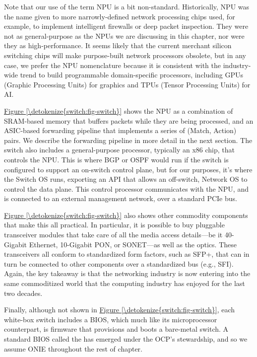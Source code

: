 \documentclass[letterpaper,11pt,english]{sphinxmanual}
\begin{document}
Note that our use of the term NPU is a bit non-standard. Historically,
NPU was the name given to more narrowly-defined network processing
chips used, for example, to implement intelligent firewalls or deep
packet inspection. They were not as general-purpose as the NPUs we are
discussing in this chapter, nor were they as high-performance. It
seems likely that the current merchant silicon switching chips will
make purpose-built network processors obsolete, but in any case, we
prefer the NPU nomenclature because it is consistent with the
industry-wide trend to build programmable domain-specific processors,
including GPUs (Graphic Processing Units) for graphics and TPUs
(Tensor Processing Units) for AI.

\hyperref[\detokenize{switch:fig-switch}]{Figure \ref{\detokenize{switch:fig-switch}}} shows the NPU as a combination of
SRAM-based memory that buffers packets while they are being processed,
and an ASIC-based forwarding pipeline that implements a series of
(Match, Action) pairs. We describe the forwarding pipeline in more
detail in the next section. The switch also includes a general-purpose
processor, typically an x86 chip, that controls the NPU. This is where
BGP or OSPF would run if the switch is configured to support an
on-switch control plane, but for our purposes, it’s where the Switch
OS runs, exporting an API that allows an off-switch, Network OS to
control the data plane. This control processor communicates with the
NPU, and is connected to an external management network, over a
standard PCIe bus.

\hyperref[\detokenize{switch:fig-switch}]{Figure \ref{\detokenize{switch:fig-switch}}} also shows other commodity
components that make this all practical. In particular, it is possible
to buy pluggable transceiver modules that take care of all the media
access details—be it 40-Gigabit Ethernet, 10-Gigabit PON, or SONET—as
well as the optics. These transceivers all conform to standardized
form factors, such as SFP+, that can in turn be connected to other
components over a standardized bus (e.g., SFI). Again, the key
takeaway is that the networking industry is now entering into the same
commoditized world that the computing industry has enjoyed for the
last two decades.

Finally, although not shown in \hyperref[\detokenize{switch:fig-switch}]{Figure \ref{\detokenize{switch:fig-switch}}}, each
white-box switch includes a BIOS, which much like its microprocessor
counterpart, is firmware that provisions and boots a bare-metal
switch. A standard BIOS called the  has emerged under the OCP’s stewardship, and so we assume ONIE
throughout the rest of chapter.
\end{document}
